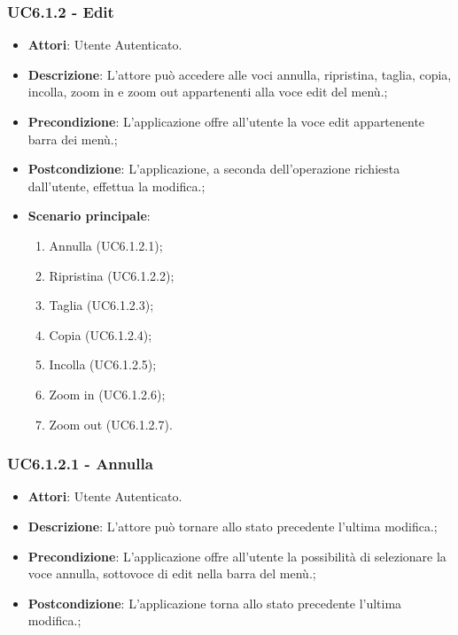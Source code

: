\subsubsection{UC6.1.2 - Edit} 
\label{sssec:UC6.1.2} 
\begin{itemize} 
\item \textbf{Attori}: Utente Autenticato.
\item \textbf{Descrizione}: L’attore può accedere alle voci annulla, ripristina, taglia, copia, incolla, zoom in e zoom out appartenenti alla voce edit del menù.;
\item \textbf{Precondizione}: L’applicazione offre all’utente la voce edit appartenente barra
dei menù.;
\item \textbf{Postcondizione}: L’applicazione, a seconda dell’operazione richiesta dall’utente,
effettua la modifica.;
\item \textbf{Scenario principale}: \begin{enumerate}\item Annulla (UC6.1.2.1);\item Ripristina (UC6.1.2.2);\item Taglia (UC6.1.2.3);\item Copia (UC6.1.2.4);\item Incolla (UC6.1.2.5);\item Zoom in (UC6.1.2.6);\item Zoom out (UC6.1.2.7). 
 \end{enumerate}
\end{itemize} 
\subsubsection{UC6.1.2.1 - Annulla} 
\label{sssec:UC6.1.2.1} 
\begin{itemize} 
\item \textbf{Attori}: Utente Autenticato.
\item \textbf{Descrizione}: L’attore può tornare allo stato precedente l’ultima
modifica.;
\item \textbf{Precondizione}: L’applicazione offre all’utente la possibilità di selezionare la voce
annulla, sottovoce di edit nella barra del menù.;
\item \textbf{Postcondizione}: L’applicazione torna allo stato precedente l’ultima modifica.;
\end{itemize} 

